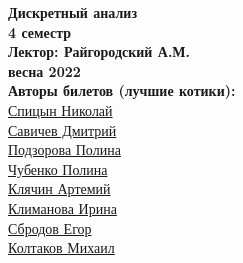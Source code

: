 


    \thispagestyle{empty}
    \BgThispage
    \begin{center}
        \vspace*{4cm}
        
        \Huge
        \textbf{Дискретный анализ} \\
        \textbf{4 семестр} \\
        \textbf{Лектор: Райгородский А.М.} \\
        \textbf{весна 2022} \\
    
        
        \vspace{7cm}
        \Large
        \textbf{Авторы билетов (лучшие котики):} \\
        \href{https://vk.com/spitsynn}{Спицын Николай} \\
        \href{https://vk.com/dimasav123}{Савичев Дмитрий} \\
        \href{https://vk.com/id165779384}{Подзорова Полина} \\
        \href{https://vk.com/poli.dobro}{Чубенко Полина} \\
        \href{https://vk.com/id340504554}{Клячин Артемий} \\
        \href{https://vk.com/meraklim}{Климанова Ирина} \\
        \href{https://vk.com/ulegor}{Сбродов Егор} \\
        \href{https://vk.com/id153425653}{Колтаков Михаил} \\
        
    \end{center}

\newpage

\tableofcontents
\newpage





